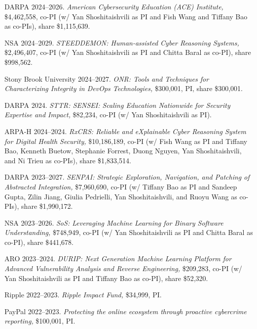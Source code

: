 \documentclass[11pt,letterpaper,sans]{moderncv}
\begin{document}
\begin{etaremune}

\item DARPA 2024--2026. \textit{American Cybersecurity Education (ACE) Institute,} \$4,462,558, co-PI (w/ Yan Shoshitaishvili as PI and Fish Wang and Tiffany Bao as co-PIs), share \$1,115,639.

\item NSA 2024--2029. \textit{STEEDDEMON: Human-assisted Cyber Reasoning Systems,} \$2,496,407, co-PI (w/ Yan Shoshitaishvili as PI and Chitta Baral as co-PI), share \$998,562.

\item Stony Brook University 2024--2027. \textit{ONR: Tools and Techniques for Characterizing Integrity in DevOps Technologies,} \$300,001, PI, share \$300,001.

\item DARPA 2024. \textit{STTR: SENSEI: Scaling Education Nationwide for Security Expertise and Impact,} \$82,234, co-PI (w/ Yan Shoshitaishvili as PI).

\item ARPA-H 2024--2024. \textit{RxCRS: Reliable and eXplainable Cyber Reasoning System for Digital Health Security,} \$10,186,189, co-PI (w/ Fish Wang as PI and Tiffany Bao, Kenneth Buetow, Stephanie Forrest, Duong Nguyen, Yan Shoshitaishvili, and Ni Trieu as co-PIs), share \$1,833,514.

\item DARPA 2023--2027. \textit{SENPAI: Strategic Exploration, Navigation, and Patching of Abstracted Integration,} \$7,960,690, co-PI (w/ Tiffany Bao as PI and Sandeep Gupta, Zilin Jiang, Giulia Pedrielli, Yan Shoshitaishvili, and Ruoyu Wang as co-PIs), share \$1,990,172.

\item NSA 2023--2026. \textit{SoS: Leveraging Machine Learning for Binary Software Understanding,} \$748,949, co-PI (w/ Yan Shoshitaishvili as PI and Chitta Baral as co-PI), share \$441,678.  

\item ARO 2023--2024. \textit{DURIP: Next Generation Machine Learning Platform for Advanced Vulnerability Analysis and Reverse Engineering,} \$209,283, co-PI (w/ Yan Shoshitaishvili as PI and Tiffany Bao as co-PI), share \$52,320.
  
\item Ripple 2022--2023. \textit{Ripple Impact Fund,} \$34,999, PI.
  
\item PayPal 2022--2023. \textit{Protecting the online ecosystem through proactive cybercrime reporting,} \$100,001, PI.


\end{etaremune}
\end{document}
